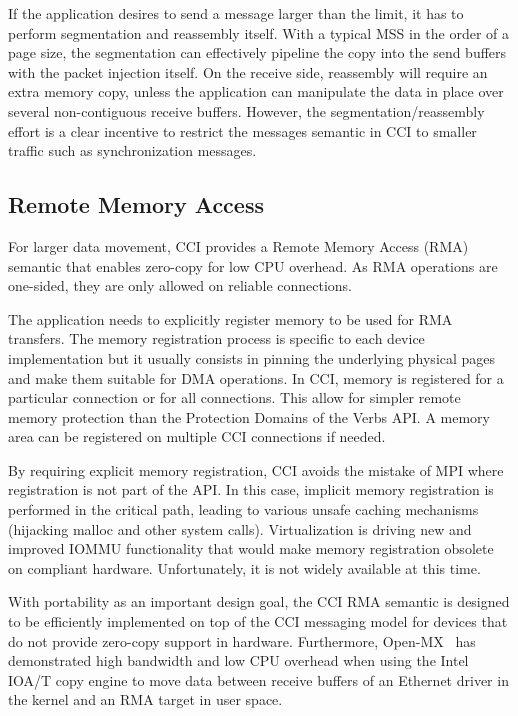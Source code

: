If the application desires to send a message larger than the limit, it has 
to perform segmentation and reassembly itself. With a typical MSS in the order 
of a page size, the segmentation can effectively pipeline the copy into the 
send buffers with the packet injection itself. On the receive side, 
reassembly will require an extra memory copy, unless the application can 
manipulate the data in place over several non-contiguous receive buffers.
However, the segmentation/reassembly effort is a clear incentive 
to restrict the messages semantic in CCI to smaller traffic 
such as synchronization messages.

\subsection{Remote Memory Access}
For larger data movement, CCI provides a Remote Memory Access (RMA) semantic 
that enables zero-copy for low CPU overhead. As RMA operations are one-sided, 
they are only allowed on reliable connections. 

The application needs to explicitly register memory to be used for RMA 
transfers. The memory registration process is specific to each device 
implementation but it usually consists in pinning the underlying physical 
pages and make them suitable for DMA operations. In CCI, memory is registered 
for a particular connection or for all connections. This allow for simpler 
remote memory protection than the Protection Domains of the Verbs API. A 
memory area can be registered on multiple CCI connections if needed.

By requiring explicit memory registration, CCI avoids the mistake of MPI 
where registration is not part of the API. In this case, implicit memory registration is performed in the critical 
path, leading to various unsafe caching mechanisms~\cite{regcache} 
(hijacking malloc and other system calls). 
Virtualization is driving new and improved IOMMU functionality 
that would make memory registration obsolete on compliant hardware. 
Unfortunately, it is not widely available at this time.

With portability as an important design goal, the CCI RMA semantic is 
designed to be efficiently implemented on top of the CCI messaging model 
for devices that do not provide zero-copy support in hardware. 
Furthermore, Open-MX~\cite{Gog11ParCo} has demonstrated high bandwidth and low CPU 
overhead when using the Intel IOA/T copy engine to move data between receive 
buffers of an Ethernet driver in the kernel and an RMA target in user 
space.

